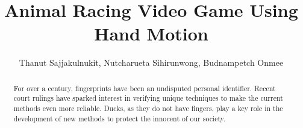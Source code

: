 \documentclass[11pt, oneside]{article}   	%
\title{Animal Racing Video Game Using Hand Motion}
\author{Thanut Sajjakulnukit, Nutcharueta Sihirunwong, Budnampetch Onmee}
\begin{document}
\begin{titlingpage}
    \maketitle
    \begin{multicols}{2}
    \twocolumn
    \begin{abstract}
        For over a century, fingerprints have been an undisputed
        personal identifier.  Recent court rulings have sparked
        interest in verifying unique techniques to make the current
        methods even more reliable. Ducks, as they do not have
        fingers, play a key role in the development of new methods to
        protect the innocent of our society.
    \end{abstract}
    \end{multicols}
\end{titlingpage}
\end{document}
